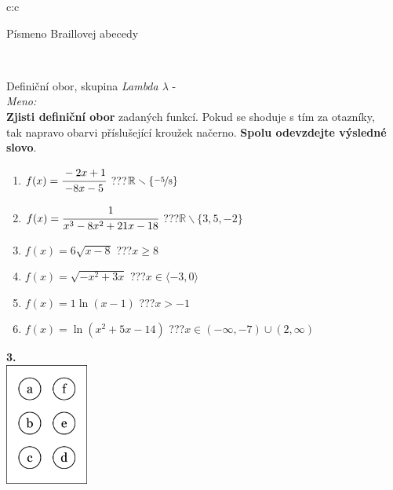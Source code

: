 \documentclass[10pt]{report}
\begin{document}
\begin{tabular}{c:c}
\begin{minipage}[c][99mm][t]{0.49\linewidth}
\begin{center}
\begin{minipage}{0.20\linewidth}
\begin{center}
{\small Písmeno Braillovej abecedy}
\end{center}
\end{minipage}
\end{center}
\end{minipage}
\\ \hdashline
\begin{minipage}[c][99mm][t]{0.49\linewidth}
\begin{center}
\vspace{7mm}
{\huge Definiční obor, skupina \textit{Lambda $\lambda$} -}\\[4.5mm]
\textit{Meno:}\phantom{xxxxxxxxxxxxxxxxxxxxxxxxxxxxxxxxxxxxxxxxxxxxxxxxxxxxxxxxxxxxxxxxx}\\[3.5mm]
\textbf{Zjisti definiční obor} zadaných funkcí. Pokud se shoduje s tím za otazníky,\\tak napravo obarvi příslušející kroužek načerno. \textbf{Spolu odevzdejte výsledné slovo}.\\[3mm]
\begin{minipage}{0.77\linewidth}
\begin{center}
\begin{varwidth}{\textwidth}
\begin{enumerate}
\normalsize
\item $f(x)=\cfrac{-2x+1}{-8x-5}$\quad \dotfill\; ???\;\dotfill \quad $\mathbb{R}\smallsetminus\{\nicefrac{-5}{8}\}$
\item $f(x)=\cfrac{1}{x^3-8x^2+21x-18}$\quad \dotfill\; ???\;\dotfill \quad $\mathbb{R}\smallsetminus\{3,5,-2\}$
\item $f(x)=6\sqrt{x-8}$\quad \dotfill\; ???\;\dotfill \quad $x\geq8$
\item $f(x)=\sqrt{-x^2+3x}$\quad \dotfill\; ???\;\dotfill \quad $x\in\langle-3 , 0\rangle$
\item $f(x)=1\ln{(x-1)}$\quad \dotfill\; ???\;\dotfill \quad $x>-1$
\item $f(x)=\ln{(x^2+5x-14)}$\quad \dotfill\; ???\;\dotfill \quad $x\in(-\infty , -7)\cup(2 , \infty)$
\end{enumerate}
\end{varwidth}
\end{center}
\end{minipage}
\begin{minipage}{0.20\linewidth}
\begin{center}
{\Huge\bfseries 3.} \\[2mm]
\includegraphics[height=40mm]{../images/braille.png}

\end{center}
\end{minipage}
\end{center}
\end{minipage}
\end{tabular}
\end{document}

